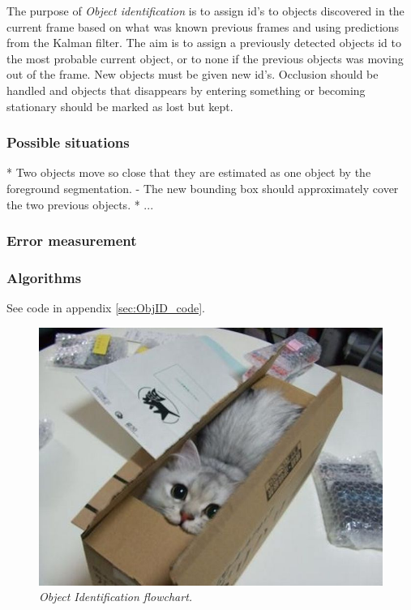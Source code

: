 The purpose of \emph{Object identification} is to assign id's to objects discovered in the current frame based on what was known previous frames and using predictions from the Kalman filter. The aim is to assign a previously detected objects id to the most probable current object, or to none if the previous objects was moving out of the frame. New objects must be given new id's. Occlusion should be handled and objects that disappears by entering something or becoming stationary should be marked as lost but kept.

\subsubsection{Possible situations}
* Two objects move so close that they are estimated as one object by the foreground segmentation.
   - The new bounding box should approximately cover the two previous objects.
* ...

\subsubsection{Error measurement}



\subsubsection{Algorithms}
See code in appendix \ref{sec:ObjID_code}. %

\begin{figure}[htb]
	\centering
	\includegraphics[width=\linewidth]{images/acatisfinetoo}
	\caption{\textit{Object Identification flowchart.}}
	\label{fig:ObjID_fig} %
\end{figure}
